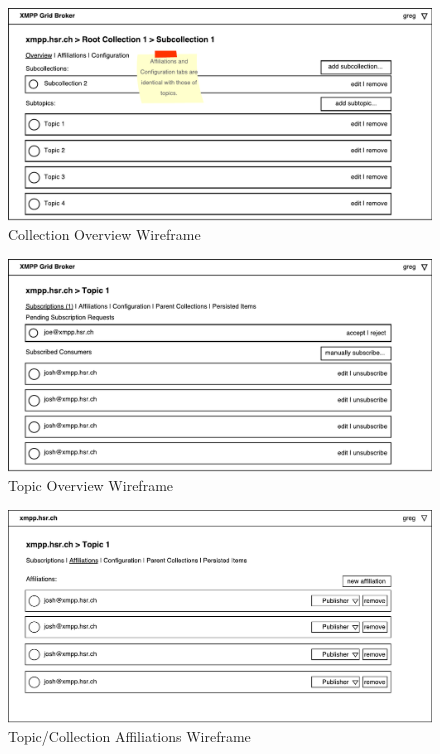 \begin{figure}[h]
    \centering
    \includegraphics[width=1\linewidth]{resources/wireframe_7}
    \caption{Collection Overview Wireframe}
\end{figure}

\begin{figure}[h]
    \centering
    \includegraphics[width=1\linewidth]{resources/wireframe_8}
    \caption{Topic Overview Wireframe}
\end{figure}

\begin{figure}[h]
    \centering
    \includegraphics[width=1\linewidth]{resources/wireframe_9}
    \caption{Topic/Collection Affiliations Wireframe}
\end{figure}

